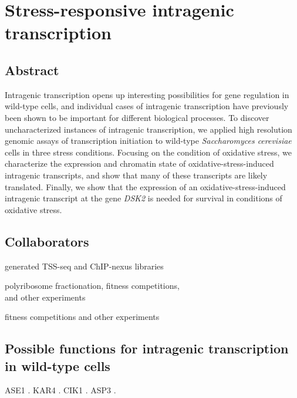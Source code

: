 \chapter{Stress-responsive intragenic transcription}
\label{chapter:stress}

\section{Abstract}

Intragenic transcription opens up interesting possibilities for gene regulation in wild-type cells, and individual cases of intragenic transcription have previously been shown to be important for different biological processes.
To discover uncharacterized instances of intragenic transcription, we applied high resolution genomic assays of transcription initiation to wild-type \textit{Saccharomyces cerevisiae} cells in three stress conditions.
Focusing on the condition of oxidative stress, we characterize the expression and chromatin state of oxidative-stress-induced intragenic transcripts, and show that many of these transcripts are likely translated.
Finally, we show that the expression of an oxidative-stress-induced intragenic transcript at the gene \textit{DSK2} is needed for survival in conditions of oxidative stress.

\section{Collaborators}

\begin{description}[align=right, labelwidth=5cm, noitemsep, leftmargin=!]
    \item [Steve Doris] generated TSS-seq and ChIP-nexus libraries
    \item [Dan Spatt] polyribosome fractionation, fitness competitions,\\and other experiments
    \item [James Warner] fitness competitions and other experiments
\end{description}

\section{Possible functions for intragenic transcription in wild-type cells}

ASE1 \citep{mcknight2014}.
KAR4 \citep{gammie1999}.
CIK1 \citep{benanti2009}.
ASP3 \citep{huang2010}.


